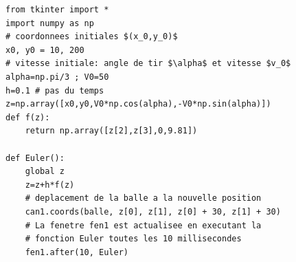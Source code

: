 \documentclass{beamer}
\begin{document}
\begin{frame}[fragile]

\begin{verbatim}
from tkinter import *
import numpy as np
# coordonnees initiales $(x_0,y_0)$
x0, y0 = 10, 200
# vitesse initiale: angle de tir $\alpha$ et vitesse $v_0$
alpha=np.pi/3 ; V0=50
h=0.1 # pas du temps
z=np.array([x0,y0,V0*np.cos(alpha),-V0*np.sin(alpha)])
def f(z):
    return np.array([z[2],z[3],0,9.81])

def Euler():
    global z
    z=z+h*f(z)
    # deplacement de la balle a la nouvelle position
    can1.coords(balle, z[0], z[1], z[0] + 30, z[1] + 30)
    # La fenetre fen1 est actualisee en executant la
    # fonction Euler toutes les 10 millisecondes
    fen1.after(10, Euler)
\end{verbatim}
\end{frame}
\end{document}
